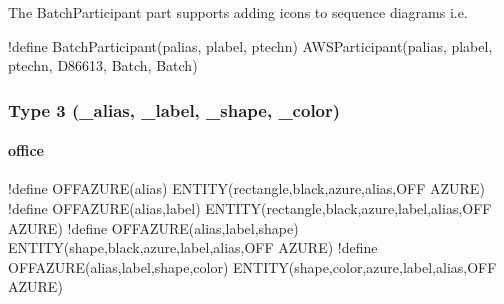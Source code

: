 \documentclass[letterpaper,10pt,english]{sphinxmanual}
\begin{document}
The BatchParticipant part supports adding icons to sequence diagrams
i.e.

\begin{sphinxVerbatim}[commandchars=\\\{\}]
!define BatchParticipant(p\PYGZus{}alias, p\PYGZus{}label, p\PYGZus{}techn) AWSParticipant(p\PYGZus{}alias, p\PYGZus{}label, p\PYGZus{}techn, \PYGZsh{}D86613, Batch, Batch)
\end{sphinxVerbatim}

\begin{figure}[htbp]
\centering
\capstart

\caption{}\label{\detokenize{Stdlib/StdLibOverview:id2}}\end{figure}


\subsubsection{Type 3 (\_alias, \_label, \_shape, \_color)}
\label{\detokenize{Stdlib/StdLibOverview:type-3-alias-label-shape-color}}

\paragraph{office}
\label{\detokenize{Stdlib/StdLibOverview:office}}

\begin{sphinxVerbatim}[commandchars=\\\{\}]
!define OFF\PYGZus{}AZURE(\PYGZus{}alias) ENTITY(rectangle,black,azure,\PYGZus{}alias,OFF AZURE)
!define OFF\PYGZus{}AZURE(\PYGZus{}alias,\PYGZus{}label) ENTITY(rectangle,black,azure,\PYGZus{}label,\PYGZus{}alias,OFF AZURE)
!define OFF\PYGZus{}AZURE(\PYGZus{}alias,\PYGZus{}label,\PYGZus{}shape) ENTITY(\PYGZus{}shape,black,azure,\PYGZus{}label,\PYGZus{}alias,OFF AZURE)
!define OFF\PYGZus{}AZURE(\PYGZus{}alias,\PYGZus{}label,\PYGZus{}shape,\PYGZus{}color) ENTITY(\PYGZus{}shape,\PYGZus{}color,azure,\PYGZus{}label,\PYGZus{}alias,OFF AZURE)
\end{sphinxVerbatim}
\end{document}
